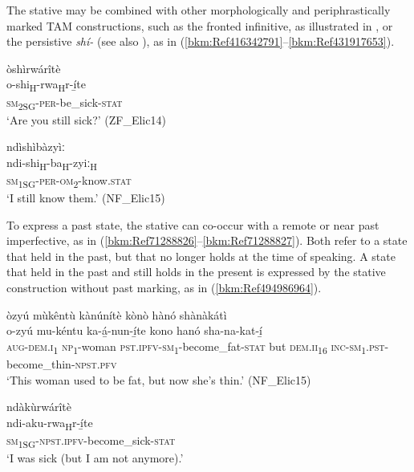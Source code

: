 The stative may be combined with other morphologically and periphrastically marked TAM constructions, such as the fronted infinitive, as illustrated in , or the persistive \textit{shí-} (see also ), as in (\ref{bkm:Ref416342791}--\ref{bkm:Ref431917653}).

\ea
\label{bkm:Ref416342791}
\glll òshìrwárîtè\\
o-shi\textsubscript{H}-rwa\textsubscript{H}r-í̲te\\
\textsc{sm}\textsubscript{2SG}-\textsc{per}-be\_sick-\textsc{stat}\\
\glt ‘Are you still sick?’ (ZF\_Elic14)
\z

\ea
\label{bkm:Ref431917653}
\glll ndìshìbàzyìː\\
ndi-shi\textsubscript{H}-ba\textsubscript{H}-zyiː\textsubscript{H}\\
\textsc{sm}\textsubscript{1SG}-\textsc{per}-\textsc{om}\textsubscript{2}-know.\textsc{stat}\\
\glt ‘I still know them.’ (NF\_Elic15)
\z

To express a past state, the stative can co-occur with a remote or near past imperfective, as in (\ref{bkm:Ref71288826}--\ref{bkm:Ref71288827}). Both refer to a state that held in the past, but that no longer holds at the time of speaking. A state that held in the past and still holds in the present is expressed by the stative construction without past marking, as in (\ref{bkm:Ref494986964}).

\ea
\label{bkm:Ref71288826}
òzyú mùkêntù kànúnítè kònò hànó shànàkátì\\
\gll o-zyú    mu-kéntu  ka-á̲-nun-í̲te kono  hanó    sha-na-kat-í̲\\
\textsc{aug}-\textsc{dem}.\textsc{i}\textsubscript{1}  \textsc{np}\textsubscript{1}-woman  \textsc{pst}.\textsc{ipfv}-\textsc{sm}\textsubscript{1}-become\_fat-\textsc{stat}
but  \textsc{dem}.\textsc{ii}\textsubscript{16}  \textsc{inc}-\textsc{sm}\textsubscript{1}.\textsc{pst}-become\_thin-\textsc{npst}.\textsc{pfv}\\
\glt ‘This woman used to be fat, but now she’s thin.’ (NF\_Elic15)
\z

\ea
\label{bkm:Ref71288827}
\glll ndàkùrwárîtè\\
ndi-aku-rwa\textsubscript{H}r-í̲te\\
\textsc{sm}\textsubscript{1SG}-\textsc{npst}.\textsc{ipfv}-become\_sick-\textsc{stat}\\
\glt ‘I was sick (but I am not anymore).’
\z

